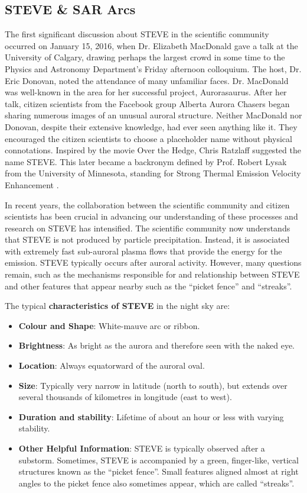 \documentclass{article}
\renewcommand{\cite}[1]{\parencite{#1}}
\newcommand{\contributed}[1]{%
    \par\noindent
    \begingroup
    \setlength{\leftskip}{1em}%
    \itshape
    Contributors: #1
    \par
    \endgroup
    \vspace{0.5em}
}
\begin{document}
\subsection{STEVE \& SAR Arcs}\label{STEVE&SAR}  
The first significant discussion about STEVE in the scientific community occurred on January 15, 2016, when Dr. Elizabeth MacDonald gave a talk at the University of Calgary, drawing perhaps the largest crowd in some time to the Physics and Astronomy Department's Friday afternoon colloquium. The host, Dr. Eric Donovan, noted the attendance of many unfamiliar faces. Dr. MacDonald was well-known in the area for her successful project, Aurorasaurus. After her talk, citizen scientists from the Facebook group Alberta Aurora Chasers began sharing numerous images of an unusual auroral structure. Neither MacDonald nor Donovan, despite their extensive knowledge, had ever seen anything like it. They encouraged the citizen scientists to choose a placeholder name without physical connotations. Inspired by the movie Over the Hedge, Chris Ratzlaff suggested the name STEVE. This later became a backronym defined by Prof. Robert Lysak from the University of Minnesota, standing for Strong Thermal Emission Velocity Enhancement \cite{Gallardolacourt_2019}.

In recent years, the collaboration between the scientific community and citizen scientists has been crucial in advancing our understanding of these processes and research on STEVE has intensified. The scientific community now understands that STEVE is not produced by particle precipitation. Instead, it is associated with extremely fast sub-auroral plasma flows that provide the energy for the emission. STEVE typically occurs after auroral activity. However, many questions remain, such as the mechanisms responsible for and relationship between STEVE and other features that appear nearby such as the ``picket fence'' and ``streaks''.

The typical {\bf characteristics of STEVE} in the night sky are:

\begin{itemize}
\item {\bf Colour and Shape}: White-mauve arc or ribbon. 
\item {\bf Brightness}: As bright as the aurora and therefore seen with the naked eye.
\item {\bf Location}: Always equatorward of the auroral oval. 
\item {\bf Size}: Typically very narrow in latitude (north to south), but extends over several thousands of kilometres in longitude (east to west).
\item {\bf Duration and stability}: Lifetime of about an hour or less with varying stability.
\item {\bf Other Helpful Information}: STEVE is typically observed after a substorm. Sometimes, STEVE is accompanied by a green, finger-like, vertical structures known as the ``picket fence''. Small features aligned almost at right angles to the picket fence also sometimes appear, which are called ``streaks''.
\end{itemize}
\end{document}
